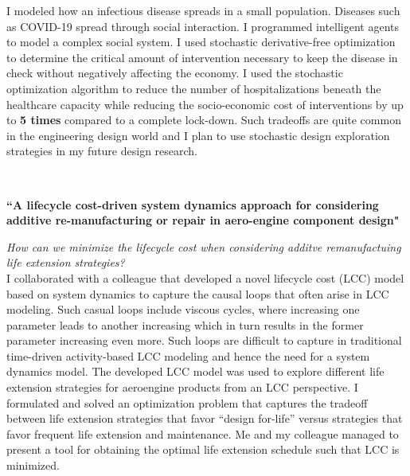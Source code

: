 \documentclass[12pt]{article} %
\begin{document}
{	I modeled how an infectious disease spreads in a small population. Diseases such as COVID-19 spread through social interaction. I programmed intelligent agents to model a complex social system. I used stochastic derivative-free optimization to determine the critical amount of intervention necessary to keep the disease in check without negatively affecting the economy. I used the stochastic optimization algorithm to reduce the number of hospitalizations beneath the healthcare capacity while reducing the socio-economic cost of interventions by up to \textbf{5 times} compared to a complete lock-down. Such tradeoffs are quite common in the engineering design world and I plan to use stochastic design exploration strategies in my future design research.

	~
	~
	~
	~
	~
	~
	~

	\medskip %

	{\raggedright\textbf{``A lifecycle cost-driven system dynamics
	approach for considering additive re-manufacturing or repair in aero-engine component design"}}
	\textit{\center How can we minimize the lifecycle cost when considering additve remanufactuing life extension strategies?}\\

	I collaborated with a colleague that developed a novel lifecycle cost (LCC) model based on system dynamics to capture the causal loops that often arise in LCC modeling. Such casual loops include viscous cycles, where increasing one parameter leads to another increasing which in turn results in the former parameter increasing even more. Such loops are difficult to capture in traditional time-driven activity-based LCC modeling and hence the need for a system dynamics model. The developed LCC model was used to explore different life extension strategies for aeroengine products from an LCC perspective. I formulated and solved an optimization problem that captures the tradeoff between life extension strategies that favor ``design for-life'' versus strategies that favor frequent life extension and maintenance. Me and my colleague managed to present a tool for obtaining the optimal life extension schedule such that LCC is minimized.

}
\end{document}
